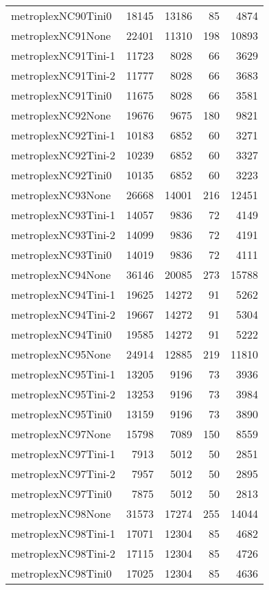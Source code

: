 \begin{longtable}{lrrrr}
metroplexNC90Tini0 & 18145 & 13186 & 85 & 4874 \\
metroplexNC91None & 22401 & 11310 & 198 & 10893 \\
metroplexNC91Tini-1 & 11723 & 8028 & 66 & 3629 \\
metroplexNC91Tini-2 & 11777 & 8028 & 66 & 3683 \\
metroplexNC91Tini0 & 11675 & 8028 & 66 & 3581 \\
metroplexNC92None & 19676 & 9675 & 180 & 9821 \\
metroplexNC92Tini-1 & 10183 & 6852 & 60 & 3271 \\
metroplexNC92Tini-2 & 10239 & 6852 & 60 & 3327 \\
metroplexNC92Tini0 & 10135 & 6852 & 60 & 3223 \\
metroplexNC93None & 26668 & 14001 & 216 & 12451 \\
metroplexNC93Tini-1 & 14057 & 9836 & 72 & 4149 \\
metroplexNC93Tini-2 & 14099 & 9836 & 72 & 4191 \\
metroplexNC93Tini0 & 14019 & 9836 & 72 & 4111 \\
metroplexNC94None & 36146 & 20085 & 273 & 15788 \\
metroplexNC94Tini-1 & 19625 & 14272 & 91 & 5262 \\
metroplexNC94Tini-2 & 19667 & 14272 & 91 & 5304 \\
metroplexNC94Tini0 & 19585 & 14272 & 91 & 5222 \\
metroplexNC95None & 24914 & 12885 & 219 & 11810 \\
metroplexNC95Tini-1 & 13205 & 9196 & 73 & 3936 \\
metroplexNC95Tini-2 & 13253 & 9196 & 73 & 3984 \\
metroplexNC95Tini0 & 13159 & 9196 & 73 & 3890 \\
metroplexNC97None & 15798 & 7089 & 150 & 8559 \\
metroplexNC97Tini-1 & 7913 & 5012 & 50 & 2851 \\
metroplexNC97Tini-2 & 7957 & 5012 & 50 & 2895 \\
metroplexNC97Tini0 & 7875 & 5012 & 50 & 2813 \\
metroplexNC98None & 31573 & 17274 & 255 & 14044 \\
metroplexNC98Tini-1 & 17071 & 12304 & 85 & 4682 \\
metroplexNC98Tini-2 & 17115 & 12304 & 85 & 4726 \\
metroplexNC98Tini0 & 17025 & 12304 & 85 & 4636 \\

\end{longtable}
